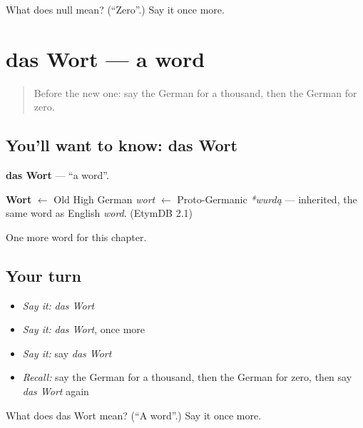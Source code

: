 \begin{tcolorbox}[breakable,colback=teal!4,colframe=teal!35!black,title={Before you move on}]
What does null mean? (\textquotedblleft{}Zero\textquotedblright{}.) Say it once more.
\end{tcolorbox}
\section[das Wort]{das Wort — a word}

\label{lesson:GE-C102-wort}



\begin{quote}
Before the new one: say the German for a thousand, then the German for zero.
\end{quote}

\subsection*{You'll want to know: das Wort}
\textbf{das Wort} — \textquotedblleft{}a word\textquotedblright{}.

\begin{cousinweb}
\textbf{Wort} $\leftarrow$ Old High German \emph{wort} $\leftarrow$ Proto-Germanic \emph{*wurdą} — inherited, the same word as English \emph{word}. (EtymDB 2.1)
\end{cousinweb}

\begin{grammarlens}[title={What you've built}]
One more word for this chapter.
\end{grammarlens}

\subsection*{Your turn}
\begin{itemize}
\raggedright
  \item \emph{Say it:} \emph{das Wort}
  \item \emph{Say it:} \emph{das Wort}, once more
  \item \emph{Say it:} say \emph{das Wort}
  \item \emph{Recall:} say the German for a thousand, then the German for zero, then say \emph{das Wort} again
\end{itemize}

\begin{tcolorbox}[breakable,colback=teal!4,colframe=teal!35!black,title={Before you move on}]
What does das Wort mean? (\textquotedblleft{}A word\textquotedblright{}.) Say it once more.
\end{tcolorbox}
